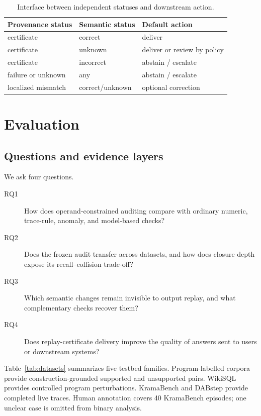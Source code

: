 \documentclass[5p,times]{elsarticle}
\begin{document}
\begin{table}[!t]
\centering
\caption{Interface between independent statuses and downstream action.}
\label{tab:policy}
\scriptsize
\begin{tabular}{@{}lll@{}}
\toprule
Provenance status & Semantic status & Default action \\
\midrule
certificate & correct & deliver \\
certificate & unknown & deliver or review by policy \\
certificate & incorrect & abstain / escalate \\
failure or unknown & any & abstain / escalate \\
localized mismatch & correct/unknown & optional correction \\
\bottomrule
\end{tabular}
\end{table}

\section{Evaluation}\label{sec:evaluation}

\subsection{Questions and evidence layers}\label{sec:setup}

We ask four questions.
\begin{description}
\item[RQ1] How does operand-constrained auditing compare with ordinary numeric, trace-rule, anomaly, and model-based checks?
\item[RQ2] Does the frozen audit transfer across datasets, and how does closure depth expose its recall--collision trade-off?
\item[RQ3] Which semantic changes remain invisible to output replay, and what complementary checks recover them?
\item[RQ4] Does replay-certificate delivery improve the quality of answers sent to users or downstream systems?
\end{description}

Table~\ref{tab:datasets} summarizes five testbed families. Program-labelled corpora provide construction-grounded supported and unsupported pairs. WikiSQL provides controlled program perturbations. KramaBench and DABstep provide completed live traces. Human annotation covers 40 KramaBench episodes; one unclear case is omitted from binary analysis.
\end{document}
